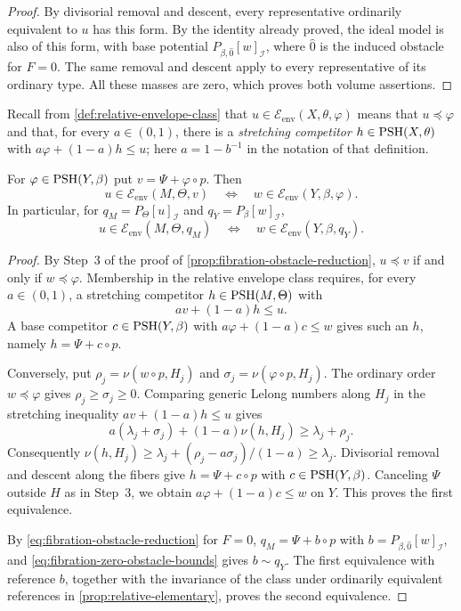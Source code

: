 \begin{proof}
By divisorial removal and descent, every representative ordinarily equivalent to $u$ has this form. By the identity already proved, the ideal model is also of this form, with base potential $P_{\beta,\widehat 0}[w]_{\mathcal I}$, where $\widehat0$ is the induced obstacle for $F=0$. The same removal and descent apply to every representative of its ordinary type. All these masses are zero, which proves both volume assertions.
\end{proof}

Recall from \cref{def:relative-envelope-class} that $u\in\mathcal E_{\mathrm{env}}(X,\theta,\varphi)$ means that $u\preceq\varphi$ and that, for every $a\in(0,1)$, there is a \emph{stretching competitor} $h\in\mathrm{PSH}(X,\theta)$ with $a\varphi+(1-a)h\leq u$; here $a=1-b^{-1}$ in the notation of that definition.

\begin{proposition}\label{prop:fibration-relative-envelope-class}
For $\varphi\in\mathrm{PSH}(Y,\beta)$ put $v=\Psi+\varphi\circ p$. Then
\[
 u\in\mathcal E_{\mathrm{env}}(M,\Theta,v)
 \quad\Longleftrightarrow\quad
 w\in\mathcal E_{\mathrm{env}}(Y,\beta,\varphi).
\]
In particular, for $q_M=P_\Theta[u]_{\mathcal I}$ and $q_Y=P_\beta[w]_{\mathcal I}$,
\[
 u\in\mathcal E_{\mathrm{env}}(M,\Theta,q_M)
 \quad\Longleftrightarrow\quad
 w\in\mathcal E_{\mathrm{env}}(Y,\beta,q_Y).
\]
\end{proposition}
\begin{proof}
By Step~3 of the proof of \cref{prop:fibration-obstacle-reduction}, $u\preceq v$ if and only if $w\preceq\varphi$. Membership in the relative envelope class requires, for every $a\in(0,1)$, a stretching competitor $h\in\mathrm{PSH}(M,\Theta)$ with
\[
 av+(1-a)h\leq u.
\]
A base competitor $c\in\mathrm{PSH}(Y,\beta)$ with $a\varphi+(1-a)c\leq w$ gives such an $h$, namely $h=\Psi+c\circ p$.

Conversely, put $\rho_j=\nu(w\circ p,H_j)$ and $\sigma_j=\nu(\varphi\circ p,H_j)$. The ordinary order $w\preceq\varphi$ gives $\rho_j\geq\sigma_j\geq0$. Comparing generic Lelong numbers along $H_j$ in the stretching inequality $av+(1-a)h\leq u$ gives
\[
 a(\lambda_j+\sigma_j)+(1-a)\nu(h,H_j)
       \geq\lambda_j+\rho_j.
\]
Consequently $\nu(h,H_j)\geq\lambda_j+(\rho_j-a\sigma_j)/(1-a)\geq\lambda_j$. Divisorial removal and descent along the fibers give $h=\Psi+c\circ p$ with $c\in\mathrm{PSH}(Y,\beta)$. Canceling $\Psi$ outside $H$ as in Step~3, we obtain $a\varphi+(1-a)c\leq w$ on $Y$. This proves the first equivalence.

By \eqref{eq:fibration-obstacle-reduction} for $F=0$, $q_M=\Psi+b\circ p$ with $b=P_{\beta,\widehat 0}[w]_{\mathcal I}$, and \eqref{eq:fibration-zero-obstacle-bounds} gives $b\sim q_Y$. The first equivalence with reference $b$, together with the invariance of the class under ordinarily equivalent references in \cref{prop:relative-elementary}, proves the second equivalence.
\end{proof}


